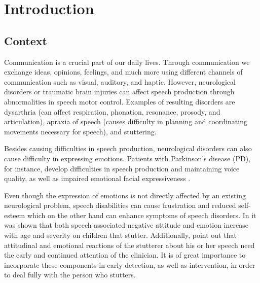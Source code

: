 \newcommand{\unlthesis}{\emph{unlthesis}}
\newcommand{\unlthesisclass}{\texttt{unlthesis.cls}}


\chapter{Introduction}
\label{cha:introduction}

\section{Context}


Communication is a crucial part of our daily lives. Through communication we exchange ideas, opinions, feelings, and much more using different channels of communication such as visual, auditory, and haptic. However, neurological disorders or traumatic brain injuries can affect speech production through abnormalities in speech motor control\cite{communicationDifficulties}. Examples of resulting disorders are dysarthria (can affect respiration, phonation, resonance, prosody, and articulation), apraxia of speech (causes difficulty in planning and coordinating movements necessary for speech), and stuttering\cite{SLPathologies}.   

Besides causing difficulties in speech production, neurological disorders can also cause difficulty in expressing emotions. Patients with Parkinson's disease (PD), for instance, develop difficulties in speech production and maintaining voice quality, as well as impaired emotional facial expressiveness \cite{Ricciardi2015}.

Even though the expression of emotions is not directly affected by an existing neurological problem, speech disabilities can cause frustration and reduced self-esteem which on the other hand can enhance symptoms of speech disorders. In \cite{Vanryckeghem2001} it was shown that both speech associated negative attitude and emotion increase with age and severity on children that stutter. Additionally, \cite{Vanryckeghem2001} point out that attitudinal and emotional reactions of the stutterer about his or her speech need the early and continued attention of the clinician. It is of great importance to incorporate these components in early detection, as well as intervention, in order to deal fully with the person who stutters.

